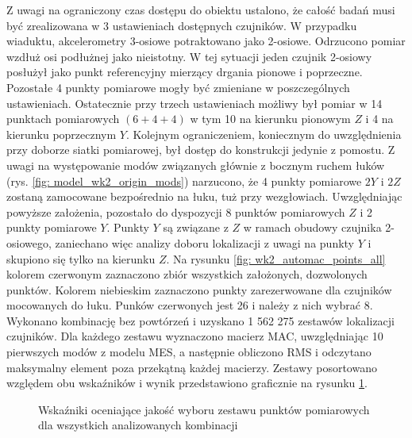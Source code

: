 Z uwagi na ograniczony czas dostępu do obiektu ustalono, że całość badań musi być zrealizowana w 3 ustawieniach dostępnych czujników. W przypadku wiaduktu, akcelerometry 3-osiowe potraktowano jako 2-osiowe. Odrzucono pomiar wzdłuż osi podłużnej jako nieistotny. W tej sytuacji jeden czujnik 2-osiowy posłużył jako punkt referencyjny mierzący drgania pionowe i poprzeczne. Pozostałe 4 punkty pomiarowe mogły być zmieniane w poszczególnych ustawieniach. Ostatecznie przy trzech ustawieniach możliwy był pomiar w 14 punktach pomiarowych $(6+4+4)$ w tym 10 na kierunku pionowym $Z$ i 4 na kierunku poprzecznym $Y$. Kolejnym ograniczeniem, koniecznym do uwzględnienia przy doborze siatki pomiarowej, był dostęp do konstrukcji jedynie z pomostu. Z uwagi na występowanie modów związanych głównie z bocznym ruchem łuków (rys. \ref{fig: model_wk2_origin_mods}) narzucono, że 4 punkty pomiarowe $2Y$ i $2Z$ zostaną zamocowane bezpośrednio na łuku, tuż przy wezgłowiach. Uwzględniając powyższe założenia, pozostało do dyspozycji 8 punktów pomiarowych $Z$ i 2 punkty pomiarowe $Y$. Punkty $Y$ są związane z $Z$ w ramach obudowy czujnika 2-osiowego, zaniechano więc analizy doboru lokalizacji z uwagi na punkty $Y$ i skupiono się tylko na kierunku $Z$. Na rysunku \ref{fig: wk2_automac_points_all} kolorem czerwonym zaznaczono zbiór wszystkich założonych, dozwolonych punktów. Kolorem niebieskim zaznaczono punkty zarezerwowane dla czujników mocowanych do łuku. Punków czerwonych jest 26 i należy z nich wybrać 8. Wykonano kombinację bez powtórzeń i uzyskano 1 562 275 zestawów lokalizacji czujników. Dla każdego zestawu wyznaczono macierz MAC, uwzględniając 10 pierwszych modów z modelu MES, a następnie obliczono RMS i odczytano maksymalny element poza przekątną każdej macierzy. Zestawy posortowano względem obu wskaźników i wynik przedstawiono graficznie na rysunku \ref{fig: wk2_automac_charts}. 
\begin{figure}[hbt!]
	\centering
	\captionsetup{justification=centering}
	\captionsetup{justification=centering}
	\caption{Wskaźniki oceniające jakość wyboru zestawu punktów pomiarowych dla wszystkich analizowanych kombinacji}
	\label{fig: wk2_automac_charts}
\end{figure}

